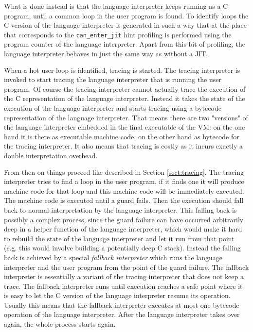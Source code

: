 \documentclass{acm_proc_article-sp}
\begin{document}
What is done instead is that the language interpreter keeps running as a C
program, until a common loop in the user program is found. To identify loops the
C version of the language interpreter is generated in such a way that at the
place that corresponds to the \texttt{can\_enter\_jit} hint profiling is
performed using the program counter of the language interpreter. Apart from this
bit of profiling, the language interpreter behaves in just the same way as
without a JIT.

When a hot user loop is identified, tracing is started. The
tracing interpreter is invoked to start tracing the language interpreter that is
running the user program. Of course the tracing interpreter cannot actually
trace the execution of the C representation of the language interpreter. Instead
it takes the state of the execution of the language interpreter and starts
tracing using a bytecode representation of the language interpreter. That means
there are two "versions" of the language interpreter embedded in the final
executable of the VM: on the one hand it is there as executable machine code, on
the other hand as bytecode for the tracing interpreter. It also means that
tracing is costly as it incurs exactly a double interpretation overhead.

From then on things proceed like described in Section \ref{sect:tracing}. The
tracing interpreter tries to find a loop in the user program, if it finds one it
will produce machine code for that loop and this machine code will be
immediately executed. The machine code is executed until a guard fails. Then the
execution should fall back to normal interpretation by the language interpreter.
This falling back is possibly a complex process, since the guard failure can
have occurred arbitrarily deep in a helper function of the language interpreter,
which would make it hard to rebuild the state of the language interpreter and
let it run from that point (e.g. this would involve building a potentially deep
C stack). Instead the falling back is achieved by a special \emph{fallback
interpreter} which runs the language interpreter and the user program from the
point of the guard failure. The fallback interpreter is essentially a variant of
the tracing interpreter that does not keep a trace. The fallback interpreter
runs until execution reaches a safe point where it is easy to let the C version
of the language interpreter resume its operation. Usually this means that the
fallback interpreter executes at most one bytecode operation of the language
interpreter. After the language interpreter takes over again, the whole process
starts again.
\end{document}
